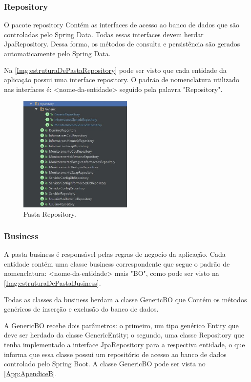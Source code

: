 \subsubsection{Repository}\label{subsubsec:Repository}



O pacote repository Contém as interfaces de acesso ao banco de dados que são controladas pelo Spring Data. Todas essas interfaces devem herdar JpaRepository. Dessa forma, os métodos de consulta e persistência são gerados automaticamente pelo Spring Data.

Na \autoref{Img:estruturaDePastaRepository} pode ser visto que cada entidade da aplicação possui uma interface repository. O padrão de nomenclatura utilizado nas interfaces é: <nome-da-entidade> seguido pela palavra "Repository".

\begin{figure}[H]
	\centering
	\includegraphics[width=0.5\textwidth]{figuras/estruturaPojetoRepository.JPG}
	\caption[Pasta Repository.]{Pasta Repository.}
	\label{Img:estruturaDePastaRepository}
\end{figure}


\subsubsection{Business}\label{subsubsec:business}

A pasta business é responsável pelas regras de negocio da aplicação. Cada entidade contém uma classe business correspondente que segue o padrão de nomenclatura: <nome-da-entidade> mais "BO", como pode ser visto na \autoref{Img:estruturaDePastaBusiness}. 

Todas as classes da business herdam a classe GenericBO que Contém os métodos genéricos de inserção e exclusão do banco de dados. 

A GenericBO recebe dois parâmetros: o primeiro, um tipo genérico Entity que deve ser herdado da classe GenericEntity; o segundo, uma classe Repository que tenha implementado a interface JpaRepository para a respectiva entidade, o que informa que essa classe possui um repositório de acesso ao banco de dados controlado pelo Spring Boot. A classe GenericBO pode ser vista no \autoref{App:ApendiceB}.

